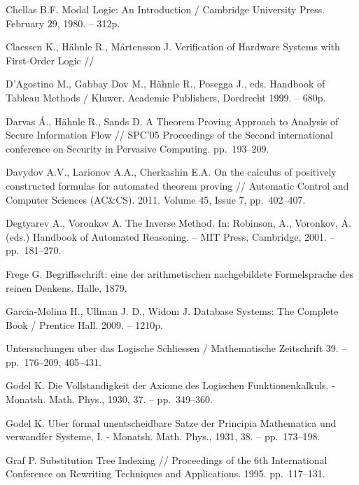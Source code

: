 \begin{thebibliography}{99}

 Chellas B.F. Modal Logic: An Introduction / Cambridge University Press. February 29, 1980. -- 312p.

 Claessen K., Hähnle R., Mårtensson J. Verification of Hardware Systems with First-Order Logic //

 D'Agostino M., Gabbay Dov M., Hähnle R., Posegga J., eds. Handbook of Tableau Methods /  Kluwer. Academic Publishers, Dordrecht 1999. -- 680p.

 Darvas Á., Hähnle R., Sands D. A Theorem Proving Approach to Analysis of Secure Information Flow // SPC'05 Proceedings of the Second international conference on Security in Pervasive Computing. pp.~193--209.


 Davydov A.V., Larionov A.A., Cherkashin E.A. On the calculus of positively constructed formulas for automated theorem proving // Automatic Control and Computer Sciences (AC\&CS). 2011. Volume 45, Issue 7, pp.~402--407.

 Degtyarev A., Voronkov A. The Inverse Method. In: Robinson, A., Voronkov, A. (eds.) Handbook of Automated Reasoning. -- MIT Press, Cambridge, 2001. -- pp.~181--270.


 Frege G. Begriffsschrift: eine der arithmetischen nachgebildete Formelsprache des reinen Denkens. Halle, 1879.

 Garcia-Molina H., Ullman J. D., Widom J. Database Systems: The Complete Book / Prentice Hall. 2009. -- 1210p.

 Untersuchungen uber das Logische Schliessen / Mathematische Zeitschrift 39. -- pp.~176--209, 405--431.


 Godel K. Die Vollstandigkeit der Axiome des Logischen Funktionenkalkuls. - Monatsh. Math. Phys., 1930, 37. -- pp.~349--360.

 Godel K. Uber formal unentscheidbare Satze der Principia Mathematica und verwandfer Systeme, I. - Monatsh. Math. Phys., 1931, 38. -- pp.~173--198.



 Graf P. Substitution Tree Indexing // Proceedings of the 6th International Conference on Rewriting Techniques and Applications. 1995. pp.~117--131.


\end{thebibliography}
